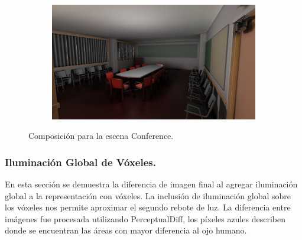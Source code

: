 \begin{figure}[H]
\begin{subfigure}[t]{.49\linewidth}
	\end{subfigure}%
	\hspace{0.01\textwidth}
	\begin{subfigure}[t]{.49\linewidth}
		\centering
		\captionsetup{justification=centering}
		\includegraphics[width=\linewidth]{media/finals/conf_gi.png}
	\end{subfigure}%
	\caption{Composición para la escena Conference.}
	\label{fig:conf_final}
\end{figure}

\subsubsection{Iluminación Global de Vóxeles.}

En esta sección se demuestra la diferencia de imagen final al agregar iluminación global a la representación con vóxeles. La inclusión de iluminación global sobre los vóxeles nos permite aproximar el segundo rebote de luz. La diferencia entre imágenes fue procesada utilizando PerceptualDiff, los píxeles azules describen donde se encuentran las áreas con mayor diferencia al ojo humano.

